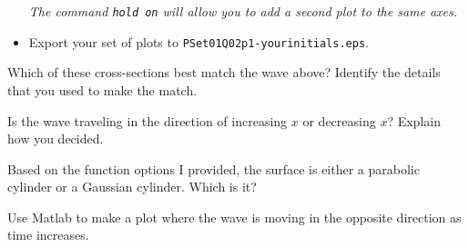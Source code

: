 \documentclass[12pt,letterpaper]{exam}
\begin{document}
\begin{questions}
\begin{parts}
\begin{itemize}
    \emph{The command \texttt{hold on} will allow you to add a second plot to the same axes.}
    \item Export your set of plots to \texttt{PSet01Q02p1-yourinitials.eps}.
\end{itemize}

\item Which of these cross-sections best match the wave above?  Identify the details that you used to make the match.

\item Is the wave traveling in the direction of increasing $x$ or decreasing $x$?  Explain how you decided.

\item Based on the function options I provided, the surface is either a parabolic cylinder or a Gaussian cylinder.  Which is it?




\item Use Matlab to make a plot where the wave is moving in the opposite direction as time increases.


\end{parts}
\end{questions}
\end{document}

